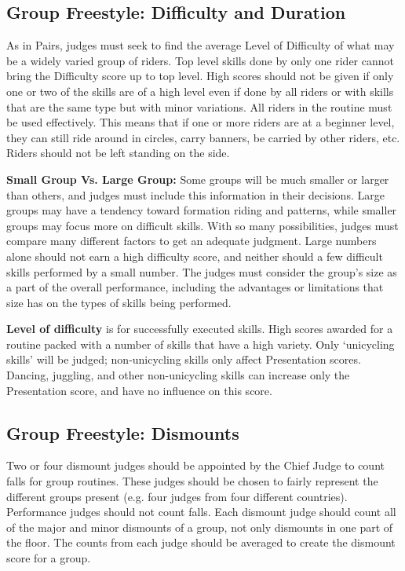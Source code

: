 \subsection{Group Freestyle: Difficulty and Duration \label{subsec:freestyle_group-additional-judging-criteria_difficulty-duration}}
As in Pairs, judges must seek to find the average Level of Difficulty of what may be a widely varied group of riders.
Top level skills done by only one rider cannot bring the Difficulty score up to top level.
High scores should not be given if only one or two of the skills are of a high level even if done by all riders or with skills that are the same type but with minor variations.
All riders in the routine must be used effectively.
This means that if one or more riders are at a beginner level, they can still ride around in circles, carry banners, be carried by other riders, etc.
Riders should not be left standing on the side.

\textbf{Small Group Vs. Large Group:} Some groups will be much smaller or larger than others, and judges must include this information in their decisions.
Large groups may have a tendency toward formation riding and patterns, while smaller groups may focus more on difficult skills.
With so many possibilities, judges must compare many different factors to get an adequate judgment.
Large numbers alone should not earn a high difficulty score, and neither should a few difficult skills performed by a small number.
The judges must consider the group's size as a part of the overall performance, including the advantages or limitations that size has on the types of skills being performed.

\textbf{Level of difficulty} is for successfully executed skills.
High scores awarded for a routine packed with a number of skills that have a high variety.
Only `unicycling skills' will be judged; non-unicycling skills only affect Presentation scores.
Dancing, juggling, and other non-unicycling skills can increase only the Presentation score, and have no influence on this score.

\subsection{Group Freestyle: Dismounts \label{subsec:freestyle_group-additional-judging-criteria_dismounts}}
Two or four dismount judges should be appointed by the Chief Judge to count falls for group routines.
These judges should be chosen to fairly represent the different groups present (e.g. four judges from four different countries).
Performance judges should not count falls.
Each dismount judge should count all of the major and minor dismounts of a group, not only dismounts in one part of the floor.
The counts from each judge should be averaged to create the dismount score for a group.

